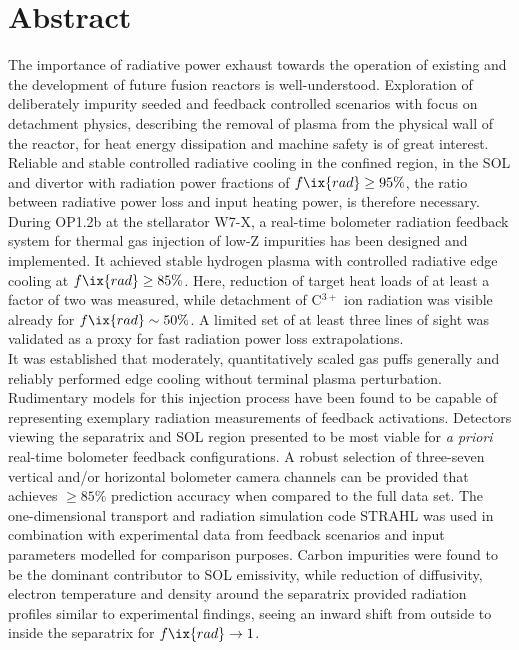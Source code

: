 %
\checkoddpage\ifoddpage\clearpage\else\cleardoublepage\fi%
%
    \chapter*{Abstract}%
%
        The importance of radiative power exhaust towards the operation of existing and the development of future fusion reactors is well-understood. Exploration of deliberately impurity seeded and feedback controlled scenarios with focus on detachment physics, describing the removal of plasma from the physical wall of the reactor, for heat energy dissipation and machine safety is of great interest. Reliable and stable controlled radiative cooling in the confined region, in the SOL and divertor with radiation power fractions of $f\ix{rad}\ge95\%$, the ratio between radiative power loss and input heating power, is therefore necessary.\\%
        During OP1.2b at the stellarator W7-X, a real-time bolometer radiation feedback system for thermal gas injection of low-Z impurities has been designed and implemented. It achieved stable hydrogen plasma with controlled radiative edge cooling at $f\ix{rad}\ge85\%$. Here, reduction of target heat loads of at least a factor of two was measured, while detachment of C$^{3+}$ ion radiation was visible already for $f\ix{rad}\sim50\%$. A limited set of at least three lines of sight was validated as a proxy for fast radiation power loss extrapolations.\\%
        It was established that moderately, quantitatively scaled gas puffs generally and reliably performed edge cooling without terminal plasma perturbation. Rudimentary models for this injection process have been found to be capable of representing exemplary radiation measurements of feedback activations. Detectors viewing the separatrix and SOL region presented to be most viable for \textit{a priori} real-time bolometer feedback configurations. A robust selection of three-seven vertical and/or horizontal bolometer camera channels can be provided that achieves $\ge85\%$ prediction accuracy when compared to the full data set. The one-dimensional transport and radiation simulation code STRAHL was used in combination with experimental data from feedback scenarios and input parameters modelled for comparison purposes. Carbon impurities were found to be the dominant contributor to SOL emissivity, while reduction of diffusivity, electron temperature and density around the separatrix provided radiation profiles similar to experimental findings, seeing an inward shift from outside to inside the separatrix for $f\ix{rad}\rightarrow1$.\\%
